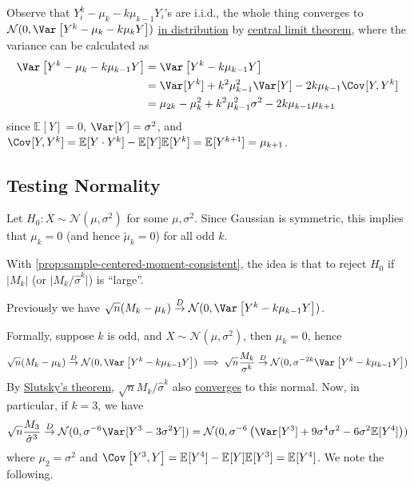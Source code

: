Observe that \(Y_i^k - \mu _k - k \mu _{k-1} Y_i\)'s are i.i.d., the whole thing converges to \(\mathcal{N} (0, \Var_{}\left[Y^k - \mu _k - k \mu _k Y\right] )\) \hyperref[def:converge-in-distribution]{in distribution} by \hyperref[thm:CLT]{central limit theorem}, where the variance can be calculated as
\[
	\begin{split}
		\Var_{}\left[Y^k - \mu _k - k \mu _{k-1} Y\right]
		 & = \Var_{}\left[Y^k - k \mu _{k-1} Y\right]                                      \\
		 & = \Var_{}[Y^k] + k^2 \mu _{k-1}^2 \Var_{}[Y] - 2 k \mu _{k-1} \Cov_{}[Y, Y^k]   \\
		 & = \mu _{2k} - \mu _k^2 + k^2 \mu _{k-1}^2 \sigma ^2 - 2 k \mu _{k-1} \mu _{k+1}
	\end{split}
\]
since \(\mathbb{E}_{}[Y] = 0\), \(\Var_{}[Y] = \sigma ^2\), and \(\Cov_{}[Y, Y^k] = \mathbb{E}_{}[Y \cdot Y^k] - \mathbb{E}_{}[Y] \mathbb{E}_{}[Y^k] = \mathbb{E}_{}[Y^{k+1}] = \mu _{k+1}\).

\subsection{Testing Normality}
Let \(H_0 \colon X \sim \mathcal{N} (\mu , \sigma ^2)\) for some \(\mu , \sigma ^2\). Since Gaussian is symmetric, this implies that \(\mu _k = 0\) (and hence \(\widetilde{\mu} _k = 0\)) for all odd \(k\).

\begin{intuition}
	With \autoref{prop:sample-centered-moment-consistent}, the idea is that to reject \(H_0\) if \(\vert M_k \vert \) (or \(\vert M_k / \hat{\sigma} ^k \vert \)) is ``large''.
\end{intuition}

\begin{prev}
	Previously we have \(\sqrt{n} (M_k - \mu _k) \overset{D}{\to} \mathcal{N} (0, \Var_{}\left[Y^k - k \mu _{k-1} Y\right] )\).
\end{prev}

Formally, suppose \(k\) is odd, and \(X \sim \mathcal{N} (\mu , \sigma ^2)\), then \(\mu _k = 0\), hence
\[
	\sqrt{n} (M_k - \mu _k) \overset{D}{\to} \mathcal{N} (0, \Var_{}\left[Y^k - k \mu _{k-1} Y\right] )
	\implies \sqrt{n} \frac{M_k}{\sigma ^k} \overset{D}{\to} \mathcal{N} (0, \sigma ^{-2k} \Var_{}\left[Y^k - k \mu _{k-1} Y\right] )
\]
By \hyperref[col:Slutsky]{Slutsky's theorem}, \(\sqrt{n} M_k / \hat{\sigma} ^k\) also \hyperref[def:converge-in-distribution]{converges} to this normal. Now, in particular, if \(k = 3\), we have
\[
	\sqrt{n} \frac{M_3}{\hat{\sigma} ^3}
	\overset{D}{\to} \mathcal{N} (0, \sigma ^{-6} \Var_{}[Y^3 - 3 \sigma ^2 Y] )
	= \mathcal{N} (0, \sigma ^{-6} \left( \Var_{}[Y^3] + 9 \sigma ^4 \sigma ^2 - 6 \sigma ^2 \mathbb{E}_{}[Y^4] \right) )
\]
where  \(\mu _2 = \sigma ^2\) and \(\Cov_{}\left[Y^3 , Y\right] = \mathbb{E}_{}[Y^4] - \mathbb{E}_{}[Y] \mathbb{E}_{}[Y^3] = \mathbb{E}_{}[Y^4] \). We note the following.

